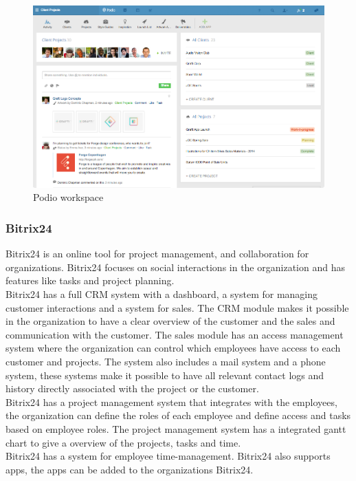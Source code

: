 \begin{figure}[H]
    \centering
    \includegraphics[scale=0.4]{Images/workspaces.png}
    \caption{Podio workspace}
    \label{fig:podio_workspace}
\end{figure}


\subsubsection{Bitrix24}
Bitrix24 is an online tool for project management, and collaboration for organizations. Bitrix24 focuses on social interactions in the organization and has features like tasks and project planning.\\
Bitrix24 has a full CRM system with a dashboard, a system for managing customer interactions and a system for sales. The CRM module makes it possible in the organization to have a clear overview of the customer and the sales and communication with the customer. The sales module has an access management system where the organization can control which employees have access to each customer and projects. The system also includes a mail system and a phone system, these systems make it possible to have all relevant contact logs and history directly associated with the project or the customer.\\
Bitrix24 has a project management system that integrates with the employees, the organization can define the roles of each employee and define access and tasks based on employee roles. The project management system has a integrated gantt chart to give a overview of the projects, tasks and time.\\
Bitrix24 has a system for employee time-management. Bitrix24 also supports apps, the apps can be added to the organizations Bitrix24\citep{website:Bitrixwhatis}. 

